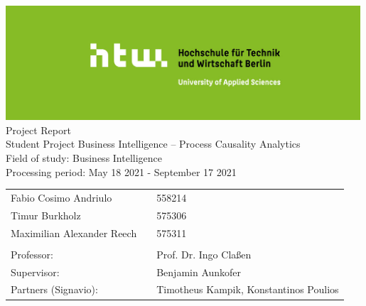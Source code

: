 \def\title{Student Project Business Intelligence – Process Causality Analytics}
\def\author{Fabio Cosimo Andriulo, Timur Burkholz, Maximilian Alexander Reech}
\begin{titlepage}
    \begin{center}
        \includegraphics[width=0.99\textwidth]{includes/csm_Logos_1330x430_612fe2f37a.jpg}\\
        \vspace{24pt}
        \small{Project Report}\\
        \vspace{24pt}
        \huge{\title{}}\\
        \vspace{36pt}
        \small{Field of study: Business Intelligence}\\
        \small{Processing period: May 18 2021 - September 17 2021}
    \end{center}
    \begin{table}[H]
        \centering
        \begin{tabular}{lll}
            \small Fabio Cosimo Andriulo            & \hspace{96pt} & \small 558214\\
            \small Timur Burkholz                   & \hspace{96pt} & \small 575306\\
            \small Maximilian Alexander Reech       & \hspace{96pt} & \small 575311\\
            \\
            \small Professor:                       & \hspace{96pt} & \small Prof. Dr. Ingo Claßen\\
            \small Supervisor:                      & \hspace{96pt} & \small Benjamin Aunkofer\\
            \small Partners (Signavio):             & \hspace{96pt} & \small Timotheus Kampik, Konstantinos Poulios\\
        \end{tabular}
    \end{table}
\end{titlepage}
\clearpage


